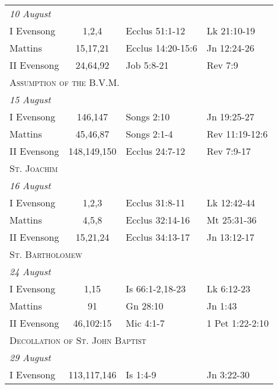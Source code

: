 \begin{longtable}{l c l l}
\multicolumn{4}{l}{\textit{10 August}}\\
\hspace{1em} I Evensong&1,2,4&Ecclus 51:1-12&Lk 21:10-19\\
\hspace{1em} Mattins&15,17,21&Ecclus 14:20-15:6&Jn 12:24-26\\
\hspace{1em} II Evensong&24,64,92&Job 5:8-21&Rev 7:9\\
%
\multicolumn{4}{l}{\textsc{Assumption of the B.V.M.}}\\
\multicolumn{4}{l}{\textit{15 August}}\\
\hspace{1em} I Evensong&146,147&Songs 2:10&Jn 19:25-27\\
\hspace{1em} Mattins&45,46,87&Songs 2:1-4&Rev 11:19-12:6\\
\hspace{1em} II Evensong&148,149,150&Ecclus 24:7-12&Rev 7:9-17\\
\multicolumn{4}{l}{\textsc{St. Joachim}}\\
\multicolumn{4}{l}{\textit{16 August}}\\
\hspace{1em} I Evensong&1,2,3&Ecclus 31:8-11&Lk 12:42-44\\
\hspace{1em} Mattins&4,5,8&Ecclus 32:14-16&Mt 25:31-36\\
\hspace{1em} II Evensong&15,21,24&Ecclus 34:13-17&Jn 13:12-17\\
\multicolumn{4}{l}{\textsc{St. Bartholomew}}\\
\multicolumn{4}{l}{\textit{24 August}}\\
\hspace{1em} I Evensong&1,15&Is 66:1-2,18-23&Lk 6:12-23\\
\hspace{1em} Mattins&91&Gn 28:10&Jn 1:43\\
\hspace{1em} II Evensong&46,102:15&Mic 4:1-7&1 Pet 1:22-2:10\\
%
\multicolumn{4}{l}{\textsc{Decollation of St. John Baptist}}\\
\multicolumn{4}{l}{\textit{29 August}}\\
\hspace{1em} I Evensong&113,117,146&Is 1:4-9&Jn 3:22-30\\

\end{longtable}
